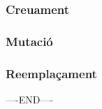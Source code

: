 \documentclass[titlepage,a4paper,12pt]{book}
\begin{document}
\subsubsection{Creuament} %
\label{ssub:Creuament}

\subsubsection{Mutació} %
\label{ssub:Mutacio}

\subsubsection{Reemplaçament} %
\label{ssub:Reemplaçament}










----END----


\end{document}
